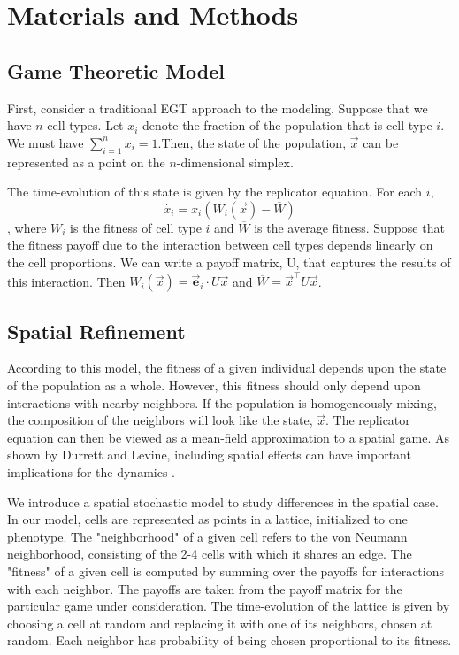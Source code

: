 \documentclass[12pt]{amsart}
\begin{document}
\section{Materials and Methods}
\subsection{Game Theoretic Model}
	First, consider a traditional EGT approach to the modeling. Suppose that we have $n$ cell types. Let $x_i$ denote the fraction of the population that is cell type $i$. We must have $\sum_{i=1}^n x_i = 1$.Then, the state of the population, $\vec{x}$ can be represented as a point on the $n$-dimensional simplex. 
	
	The time-evolution of this state is given by the replicator equation. For each $i$, $$\dot{x_i} = x_i (W_i(\vec{x}) - \overline{W})$$, where $W_i$ is the fitness of cell type $i$ and $\overline{W}$ is the average fitness. Suppose that the fitness payoff due to the interaction between cell types depends linearly on the cell proportions. We can write a payoff matrix, U, that captures the results of this interaction. Then $W_i(\vec{x}) = \vec{\textbf{e}}_i \cdot U\vec{x} $ and $\overline{W} = \vec{x}^\top U \vec{x}$.
	
\subsection{Spatial Refinement}
	According to this model, the fitness of a given individual depends upon the state of the population as a whole. However, this fitness should only depend upon interactions with nearby neighbors. If the population is homogeneously mixing, the composition of the neighbors will look like the state, $ \vec{x} $. The replicator equation can then be viewed as a mean-field approximation to a spatial game. As shown by Durrett and Levine, including spatial effects can have important implications for the dynamics \cite{Durrett1994}.
	
	We introduce a spatial stochastic model to study differences in the spatial case. In our model, cells are represented as points in a lattice, initialized to one phenotype. The "neighborhood" of a given cell refers to the von Neumann neighborhood, consisting of the 2-4 cells with which it shares an edge. The "fitness" of a given cell is computed by summing over the payoffs for interactions with each neighbor. The payoffs are taken from the payoff matrix for the particular game under consideration. The time-evolution of the lattice is given by choosing a cell at random and replacing it with one of its neighbors, chosen at random. Each neighbor has probability of being chosen proportional to its fitness. 
	
\end{document}
